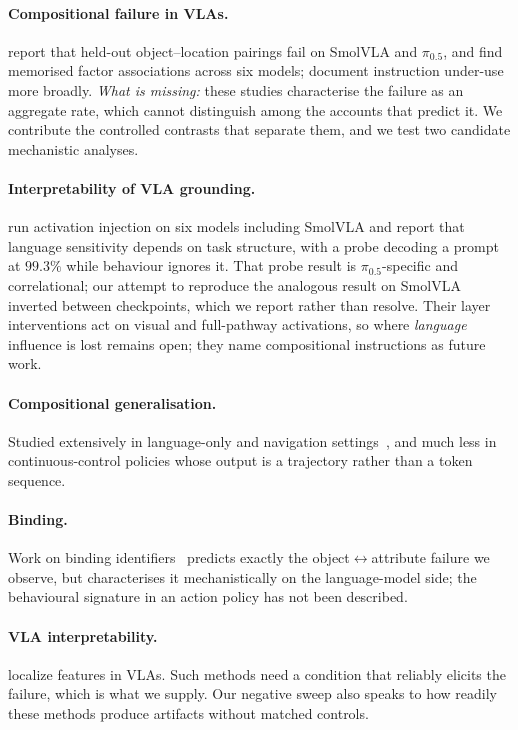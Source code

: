 \documentclass{article}
\begin{document}
\paragraph{Compositional failure in VLAs.} \citet{brittle} report that held-out
object--location pairings fail on SmolVLA and $\pi_{0.5}$, and \citet{scaleup} find memorised
factor associations across six models; \citet{better,icbench,liberocf,robosem} document
instruction under-use more broadly. \emph{What is missing:} these studies characterise the
failure as an aggregate rate, which cannot distinguish among the accounts that predict it. We
contribute the controlled contrasts that separate them, and we test two candidate mechanistic
analyses.

\paragraph{Interpretability of VLA grounding.} \citet{notallfeatures} run activation injection
on six models including SmolVLA and report that language sensitivity depends on task structure,
with a probe decoding a prompt at $99.3\%$ while behaviour ignores it. That probe result is
$\pi_{0.5}$-specific and correlational; our attempt to reproduce the analogous result on SmolVLA
inverted between checkpoints, which we report rather than resolve. Their layer interventions act
on visual and full-pathway activations, so where \emph{language} influence is lost remains open;
they name compositional instructions as future work.

\paragraph{Compositional generalisation.} Studied extensively in language-only and navigation
settings~\citep{scan,gscan}, and much less in continuous-control policies whose output is a
trajectory rather than a token sequence.

\paragraph{Binding.} Work on binding identifiers~\citep{bindingids,vlmbinding} predicts exactly
the object$\leftrightarrow$attribute failure we observe, but characterises it mechanistically on
the language-model side; the behavioural signature in an action policy has not been described.

\paragraph{VLA interpretability.} \citet{notallfeatures,vlatrace} localize features in VLAs.
Such methods need a condition that reliably elicits the failure, which is what we supply. Our
negative sweep also speaks to how readily these methods produce artifacts without matched
controls.
\end{document}
